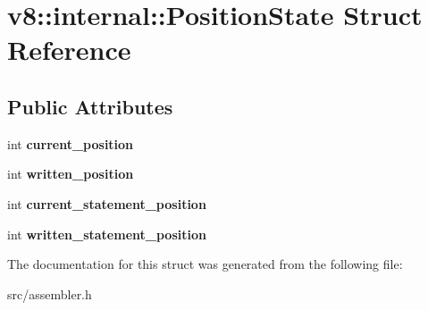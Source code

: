 \hypertarget{structv8_1_1internal_1_1_position_state}{}\section{v8\+:\+:internal\+:\+:Position\+State Struct Reference}
\label{structv8_1_1internal_1_1_position_state}
\subsection*{Public Attributes}
\begin{DoxyCompactItemize}
\item 
\hypertarget{structv8_1_1internal_1_1_position_state_ac73d503b2191a64c1d296b14663b4fcf}{}int {\bfseries current\+\_\+position}\label{structv8_1_1internal_1_1_position_state_ac73d503b2191a64c1d296b14663b4fcf}

\item 
\hypertarget{structv8_1_1internal_1_1_position_state_a657fdf78593d1217fd15eeec9e0edaab}{}int {\bfseries written\+\_\+position}\label{structv8_1_1internal_1_1_position_state_a657fdf78593d1217fd15eeec9e0edaab}

\item 
\hypertarget{structv8_1_1internal_1_1_position_state_ac6a6cca50de725a2dabb85ebffee1cf9}{}int {\bfseries current\+\_\+statement\+\_\+position}\label{structv8_1_1internal_1_1_position_state_ac6a6cca50de725a2dabb85ebffee1cf9}

\item 
\hypertarget{structv8_1_1internal_1_1_position_state_afd9d6fd2849f85c04db5deebbf97039a}{}int {\bfseries written\+\_\+statement\+\_\+position}\label{structv8_1_1internal_1_1_position_state_afd9d6fd2849f85c04db5deebbf97039a}

\end{DoxyCompactItemize}


The documentation for this struct was generated from the following file\+:\begin{DoxyCompactItemize}
\item 
src/assembler.\+h\end{DoxyCompactItemize}
